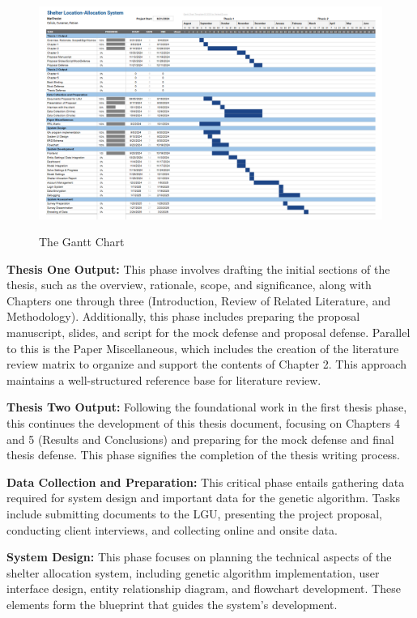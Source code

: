	\begin{landscape}
		\begin{figure}[h!]
			\caption{The Gantt Chart}
			\centering
			\includegraphics[width=600px]{Gantt}
			\label{Gantt}
		\end{figure}
	\end{landscape}
	
	\textbf{Thesis One Output:} This phase involves drafting the initial sections of the thesis, such as the overview, rationale, scope, and significance, along with Chapters one through three (Introduction, Review of Related Literature, and Methodology). Additionally, this phase includes preparing the proposal manuscript, slides, and script for the mock defense and proposal defense. Parallel to this is the Paper Miscellaneous, which includes the creation of the literature review matrix to organize and support the contents of Chapter 2. This approach maintains a well-structured reference base for literature review.
	
	\textbf{Thesis Two Output:} Following the foundational work in the first thesis phase, this continues the development of this thesis document, focusing on Chapters 4 and 5 (Results and Conclusions) and preparing for the mock defense and final thesis defense. This phase signifies the completion of the thesis writing process.
	
	\textbf{Data Collection and Preparation:} This critical phase entails gathering data required for system design and important data for the genetic algorithm. Tasks include submitting documents to the LGU, presenting the project proposal, conducting client interviews, and collecting online and onsite data.
	
	\textbf{System Design:} This phase focuses on planning the technical aspects of the shelter allocation system, including genetic algorithm implementation, user interface design, entity relationship diagram, and flowchart development. These elements form the blueprint that guides the system's development.
	
